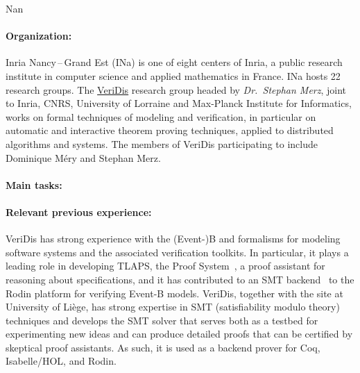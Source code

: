 \begin{sitedescription}{Nan}

\paragraph{Organization:}

Inria Nancy\,--\,Grand Est (INa) is one of eight centers of Inria, a public
research institute in computer science and applied mathematics in France. INa
hosts 22 research groups. The \href{https://team.inria.fr/veridis/}{VeriDis}
research group headed by \emph{Dr.\ Stephan Merz}, joint to Inria, CNRS,
University of Lorraine and Max-Planck Institute for Informatics, works on formal
techniques of modeling and verification, in particular on automatic and
interactive theorem proving techniques, applied to distributed algorithms and
systems. The members of VeriDis participating to \pn include Dominique M\'ery
and Stephan Merz.

\paragraph{Main tasks:}

\begin{compactitem}
\item{} 
\end{compactitem}


\paragraph{Relevant previous experience:}

VeriDis has strong experience with the (Event-)B and \tlaplus formalisms for
modeling software systems and the associated verification toolkits. In
particular, it plays a leading role in developing TLAPS, the \tlaplus Proof
System~\cite{cousineau:tla-proofs}, a proof assistant for reasoning about
\tlaplus specifications, and it has contributed to an SMT
backend~\cite{deharbe:smt-rodin} to the Rodin platform for verifying Event-B
models. VeriDis, together with the site at University of Liège, has strong
expertise in SMT (satisfiability modulo theory) techniques and develops the SMT
solver \veriT that serves both as a testbed for experimenting new ideas and can
produce detailed proofs that can be certified by skeptical proof assistants. As
such, it is used as a backend prover for Coq, Isabelle/HOL, and Rodin.


\end{sitedescription}
